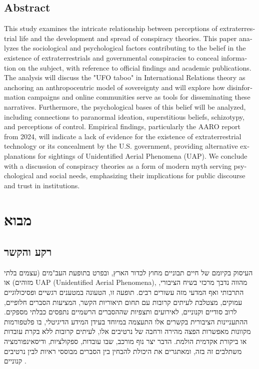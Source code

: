 \documentclass[12pt,a4paper]{article}
\begin{document}
\begin{otherlanguage}{english}
\section*{Abstract}
This study examines the intricate relationship between perceptions of extraterrestrial life and the development and spread of conspiracy theories. This paper analyzes the sociological and psychological factors contributing to the belief in the existence of extraterrestrials and governmental conspiracies to conceal information on the subject, with reference to official findings and academic publications. The analysis will discuss the "UFO taboo" in International Relations theory as anchoring an anthropocentric model of sovereignty and will explore how disinformation campaigns and online communities serve as tools for disseminating these narratives. Furthermore, the psychological bases of this belief will be analyzed, including connections to paranormal ideation, superstitious beliefs, schizotypy, and perceptions of control. Empirical findings, particularly the AARO report from 2024, will indicate a lack of evidence for the existence of extraterrestrial technology or its concealment by the U.S. government, providing alternative explanations for sightings of Unidentified Aerial Phenomena (UAP). We conclude with a discussion of conspiracy theories as a form of modern myth serving psychological and social needs, emphasizing their implications for public discourse and trust in institutions.
\end{otherlanguage}


\section{מבוא}

\subsection{רקע והקשר}
העיסוק בקיומם של חיים תבוניים מחוץ לכדור הארץ, ובפרט בתופעת העב"מים (עצמים בלתי מזוהים) או UAP (Unidentified Aerial Phenomena), מהווה נדבך מרכזי בשיח הציבורי, התרבותי ואף המדעי מזה עשורים רבים. תופעה זו, הטעונה במטענים רגשיים ופסיכולוגיים עמוקים, מצטלבת לעיתים קרובות עם תחום תיאוריות הקשר, המציעות הסברים חלופיים, לרוב סודיים וקנוניים, לאירועים ותצפיות שההסברים הרשמיים נתפסים כבלתי מספקים. ההתעניינות הציבורית בקשרים אלו התעצמה במיוחד בעידן המידע הדיגיטלי, בו פלטפורמות מקוונות מאפשרות הפצה מהירה ורחבה של נרטיבים אלו, לעיתים קרובות ללא בקרת עובדות או ביקורת אקדמית הולמת. הדבר יצר נוף מורכב, שבו עובדות, ספקולציות, ודיסאינפורמציה משתלבים זה בזה, ומאתגרים את היכולת להבחין בין הסברים מבוססי ראיות לבין נרטיבים קנוניים \cite{AntonVugrin2022, Costa2024}.
\end{document}
